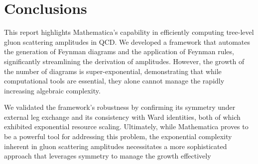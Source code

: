 \documentclass[10pt,english]{article}
\begin{document}
\maketitle







\section{Conclusions}

This report highlights Mathematica's capability in efficiently computing tree-level gluon scattering amplitudes in QCD. 
We developed a framework that automates the generation of Feynman diagrams and the application of Feynman rules, 
significantly streamlining the derivation of amplitudes. However, the growth of the number of diagrams is super-exponential, demonstrating 
that while computational tools are essential, they alone cannot manage the rapidly increasing algebraic complexity.

We validated the framework's robustness by confirming its symmetry under external leg exchange and its consistency with Ward identities, 
both of which exhibited exponential resource scaling. Ultimately, while Mathematica proves to be a powerful tool for addressing this problem, 
the exponential complexity inherent in gluon scattering amplitudes necessitates a more sophisticated approach that leverages symmetry to manage 
the growth effectively

\printbibliography
\end{document}
